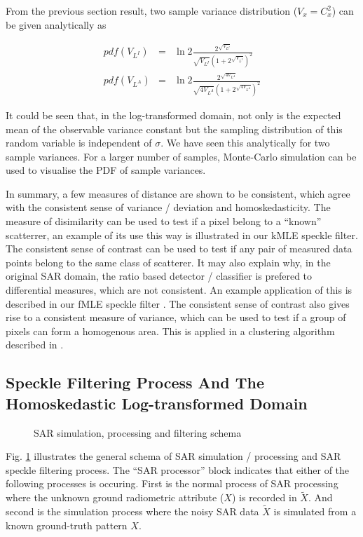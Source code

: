 \documentclass[journal]{IEEEtran}
\begin{document}
From the previous section result, two sample variance distribution ($V_x = C_x^2$) can be given analytically as

\begin{eqnarray}
pdf(V_{L^I}) &=& 
	\ln2 \frac{ 2^{\sqrt{V_{L^I}}}}{\sqrt{V_{L^I}} \left( 1+2^{\sqrt{V_{L^I}}} \right)^2} \\
pdf(V_{L^A}) &=&
	\ln2 \frac{2^{\sqrt{4V_{L^A}}}}{\sqrt{4V_{L^A}} \left( 1+2^{\sqrt{4V_{L^A}}} \right)^2} 
\end{eqnarray}

It could be seen that, in the log-transformed domain, not only is the expected mean of the observable variance constant but the sampling distribution of this random variable is independent of $\sigma$. 
We have seen this analytically for two sample variances. 
For a larger number of samples, Monte-Carlo simulation can be used to visualise the PDF of sample variances. 

In summary, a few measures of distance are shown to be consistent, which agree with the consistent sense of variance / deviation and homoskedasticity.
The measure of disimilarity can be used to test if a pixel belong to a ``known'' scatterrer, an example of its use this way is illustrated in our kMLE speckle filter.
The consistent sense of contrast can be used to test if any pair of measured data points belong to the same class of scatterer. It may also 
explain why, in the original SAR domain, the ratio based detector / classifier is prefered to differential measures, which are not consistent. 
An example application of this is described in our fMLE speckle filter \cite{Le_2011_ACRS}.
The consistent sense of contrast also gives rise to a consistent measure of variance, which can be used to test if a group of pixels can form a homogenous area.
This is applied in a clustering algorithm described in \cite{Le_2010_ACRS}.

\subsection{ Speckle Filtering Process And The Homoskedastic Log-transformed Domain}
\label{sec:schema_log_images}

\begin{figure}
 \centering
 \epsfxsize=2.4in
 \epsfysize=1.2in
\caption{SAR simulation, processing and filtering schema}
\label{fig:simul_process_filter_schema}
\end{figure}

Fig. \ref{fig:simul_process_filter_schema} illustrates the general schema of SAR simulation / processing and SAR speckle filtering process.
The ``SAR processor'' block indicates that either of the following processes is occuring.
First is the normal process of SAR processing where the unknown ground radiometric attribute ($X$) is recorded in $\tilde{X}$.
And second is the simulation process where the noisy SAR data $\tilde{X}$ is simulated from a known ground-truth pattern $X$.
\end{document}
